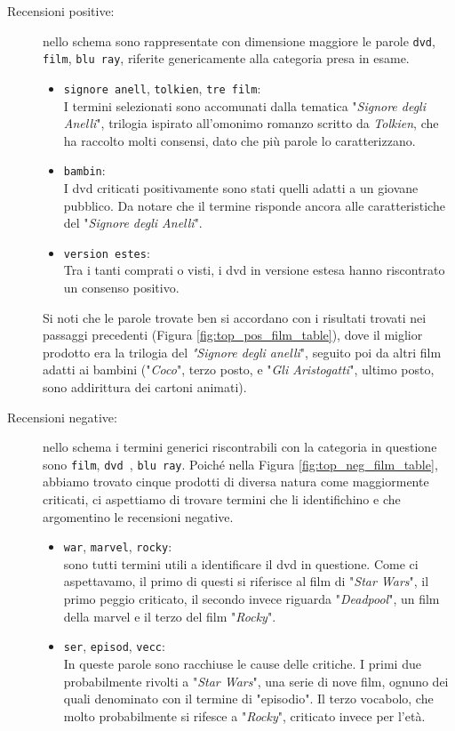 			\begin{description}
				\item[Recensioni positive:]
				nello schema sono rappresentate con dimensione maggiore le parole \verb|dvd|, \verb|film|, \verb|blu ray|, riferite genericamente alla categoria presa in esame. 	
				\begin{itemize}
					\item \texttt{signore anell}, \texttt{tolkien}, \texttt{tre film}: \\
					I termini selezionati sono accomunati dalla tematica "\textit{Signore degli Anelli}", trilogia ispirato all'omonimo romanzo scritto da \textit{Tolkien}, che ha raccolto molti consensi, dato che più parole lo caratterizzano.
					\item \texttt{bambin}: \\
					I dvd criticati positivamente sono stati quelli adatti a un giovane pubblico. Da notare che il termine risponde ancora alle caratteristiche del "\textit{Signore degli Anelli}".
					\item \texttt{version estes}: \\
					Tra i tanti comprati o visti, i dvd in versione estesa hanno riscontrato un consenso positivo.
				\end{itemize}	
				
				Si noti che le parole trovate ben si accordano con i risultati trovati nei passaggi precedenti (Figura \ref{fig:top_pos_film_table}), dove il miglior prodotto era la trilogia del \textit{"Signore degli anelli}", seguito poi da altri film adatti ai bambini ("\textit{Coco}", terzo posto, e "\textit{Gli Aristogatti}", ultimo posto, sono addirittura dei cartoni animati).
					
				\item[Recensioni negative:] 
				nello schema i termini generici riscontrabili con la categoria in questione sono \verb|film|, \verb|dvd |, \verb|blu ray|. Poiché nella Figura \ref{fig:top_neg_film_table}, abbiamo trovato cinque prodotti di diversa natura come maggiormente criticati, ci aspettiamo di trovare termini che li identifichino e che argomentino le recensioni negative.
				\begin{itemize}
					\item \texttt{war}, \texttt{marvel}, \texttt{rocky}: \\
					sono tutti termini utili a identificare il dvd in questione. Come ci aspettavamo, il primo di questi si riferisce al film di "\textit{Star Wars}", il primo peggio criticato, il secondo invece riguarda "\textit{Deadpool}", un film della marvel e il terzo del film "\textit{Rocky}". 
					\item \texttt{ser}, \texttt{episod}, \texttt{vecc}: \\
					In queste parole sono racchiuse le cause delle critiche. I primi due probabilmente rivolti a "\textit{Star Wars}", una serie di nove film, ognuno dei quali denominato con il termine di "episodio". Il terzo vocabolo, che molto probabilmente si rifesce a "\textit{Rocky}", criticato invece per l'età.		
				\end{itemize}
			\end{description}
		
